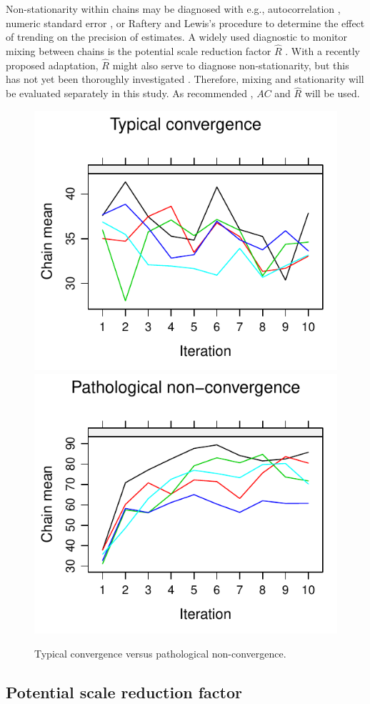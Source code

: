 \documentclass[Royal,times,sageh]{sagej}
\begin{document}
Non-stationarity within chains may be diagnosed with e.g.,
autocorrelation \citep[\(AC\);][]{scha97, gelm13}, numeric standard
error \citep[`MC error';][]{gewe92}, or Raftery and Lewis's
\citeyearpar{raft91} procedure to determine the effect of trending on
the precision of estimates. A widely used diagnostic to monitor mixing
between chains is the potential scale reduction factor \(\widehat{R}\)
\citep[`Gelman-Rubin statistic';][]{gelm92}. With a recently proposed
adaptation, \(\widehat{R}\) might also serve to diagnose
non-stationarity, but this has not yet been thoroughly investigated
\citep{veht19}. Therefore, mixing and stationarity will be evaluated
separately in this study. As recommended \citep[e.g.,][p.~898]{cowl96},
\(AC\) and \(\widehat{R}\) will be used.

\begin{figure}

{\centering \includegraphics[width=.49\linewidth]{manuscript_files/figure-latex/non-conv-1} \includegraphics[width=.49\linewidth]{manuscript_files/figure-latex/non-conv-2} 

}

\caption{Typical convergence versus pathological non-convergence.}\label{fig:non-conv}
\end{figure}

\hypertarget{potential-scale-reduction-factor}{%
\subsection{Potential scale reduction
factor}\label{potential-scale-reduction-factor}}
\end{document}

